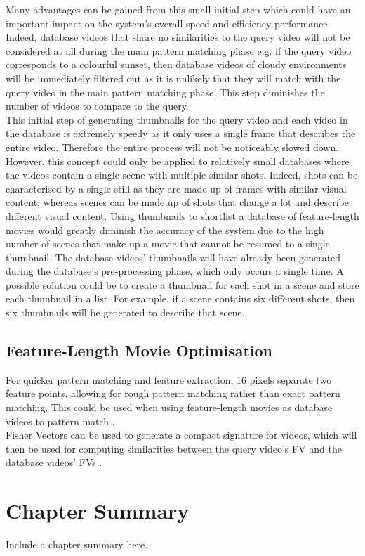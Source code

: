 Many advantages can be gained from this small initial step which could have an important impact on the system's overall speed and efficiency performance. Indeed, database videos that share no similarities to the query video will not be considered at all during the main pattern matching phase e.g. if the query video corresponds to a colourful sunset, then database videos of cloudy environments will be immediately filtered out as it is unlikely that they will match with the query video in the main pattern matching phase. This step diminishes the number of videos to compare to the query.\\

This initial step of generating thumbnails for the query video and each video in the database is extremely speedy as it only uses a single frame that describes the entire video. Therefore the entire process will not be noticeably slowed down. However, this concept could only be applied to relatively small databases where the videos contain a single scene with multiple similar shots. Indeed, shots can be characterised by a single still as they are made up of frames with similar visual content, whereas scenes can be made up of shots that change a lot and describe different visual content. Using thumbnails to shortlist a database of feature-length movies would greatly diminish the accuracy of the system due to the high number of scenes that make up a movie that cannot be resumed to a single thumbnail. The database videos' thumbnails will have already been generated during the database's pre-processing phase, which only occurs a single time. A possible solution could be to create a thumbnail for each shot in a scene and store each thumbnail in a list. For example, if a scene contains six different shots, then six thumbnails will be generated to describe that scene.


\subsection{Feature-Length Movie Optimisation}

For quicker pattern matching and feature extraction, 16 pixels separate two feature points, allowing for rough pattern matching rather than exact pattern matching. This could be used when using feature-length movies as database videos to pattern match \cite{okabe2018animating}.\\

Fisher Vectors can be used to generate a compact signature for videos, which will then be used for computing similarities between the query video's FV and the database videos' FVs \cite{araujo2017i2v}.\\


\section{Chapter Summary}

Include a chapter summary here.\\
